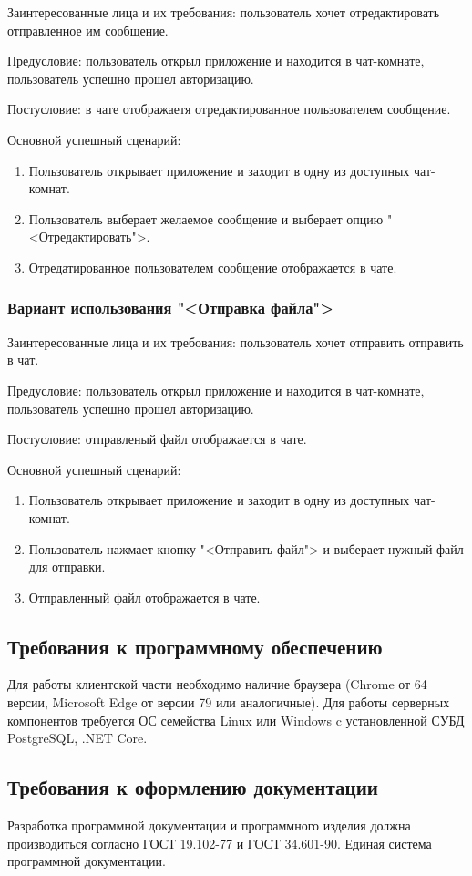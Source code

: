 Заинтересованные лица и их требования: пользователь хочет отредактировать отправленное им сообщение.

Предусловие: пользователь открыл приложение и находится в чат-комнате, пользователь успешно прошел авторизацию.

Постусловие: в чате отображаетя отредактированное пользователем сообщение.

Основной успешный сценарий:

\begin{enumerate}
	\item Пользователь открывает приложение и заходит в одну из доступных чат-комнат.
	\item Пользователь выберает желаемое сообщение и выберает опцию "<Отредактировать">.
	\item Отредатированное пользователем сообщение отображается в чате.
\end{enumerate}

\subsubsection{Вариант использования "<Отправка файла">}

Заинтересованные лица и их требования: пользователь хочет отправить отправить в чат.

Предусловие: пользователь открыл приложение и находится в чат-комнате, пользователь успешно прошел авторизацию.

Постусловие: отправленый файл отображается в чате.

Основной успешный сценарий:

\begin{enumerate}
	\item Пользователь открывает приложение и заходит в одну из доступных чат-комнат.
	\item Пользователь нажмает кнопку "<Отправить файл"> и выберает нужный файл для отправки.
	\item Отправленный файл отображается в чате.
\end{enumerate}

\subsection{Требования к программному обеспечению}

Для работы клиентской части необходимо наличие браузера (Chrome от 64 версии, Microsoft Edge от версии 79 или аналогичные).
Для работы серверных компонентов требуется ОС семейства Linux или Windows c установленной СУБД PostgreSQL, .NET Core.

\subsection{Требования к оформлению документации}

Разработка программной документации и программного изделия должна производиться согласно ГОСТ 19.102-77 и ГОСТ 34.601-90. Единая система программной документации.
